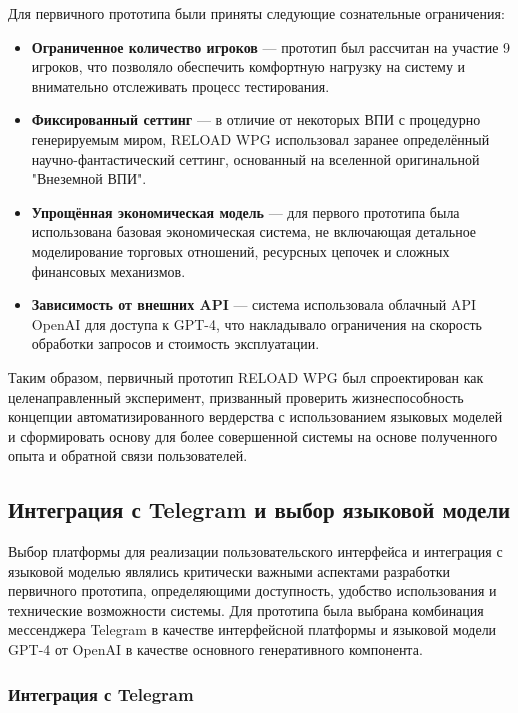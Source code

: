 Для первичного прототипа были приняты следующие сознательные ограничения:

\begin{itemize}
    \item \textbf{Ограниченное количество игроков} — прототип был рассчитан на участие 9 игроков, что позволяло обеспечить комфортную нагрузку на систему и внимательно отслеживать процесс тестирования.

    \item \textbf{Фиксированный сеттинг} — в отличие от некоторых ВПИ с процедурно генерируемым миром, RELOAD WPG использовал заранее определённый научно-фантастический сеттинг, основанный на вселенной оригинальной "{}Внеземной ВПИ"{}.

    \item \textbf{Упрощённая экономическая модель} — для первого прототипа была использована базовая экономическая система, не включающая детальное моделирование торговых отношений, ресурсных цепочек и сложных финансовых механизмов.

    \item \textbf{Зависимость от внешних API} — система использовала облачный API OpenAI для доступа к GPT-4, что накладывало ограничения на скорость обработки запросов и стоимость эксплуатации.
\end{itemize}

Таким образом, первичный прототип RELOAD WPG был спроектирован как целенаправленный эксперимент, призванный проверить жизнеспособность концепции автоматизированного вердерства с использованием языковых моделей и сформировать основу для более совершенной системы на основе полученного опыта и обратной связи пользователей.

\subsection{Интеграция с Telegram и выбор языковой модели}

Выбор платформы для реализации пользовательского интерфейса и интеграция с языковой моделью являлись критически важными аспектами разработки первичного прототипа, определяющими доступность, удобство использования и технические возможности системы. Для прототипа была выбрана комбинация мессенджера Telegram в качестве интерфейсной платформы и языковой модели GPT-4 от OpenAI в качестве основного генеративного компонента.

\subsubsection{Интеграция с Telegram}

